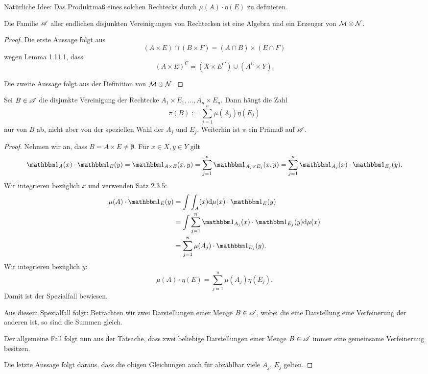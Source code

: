 \documentclass[
 a4paper,
 12pt,
 parskip=half
 ]{scrreprt}
\theoremstyle{plain}
\theoremstyle{definition}
\numberwithin{equation}{section}
\begin{document}
Natürliche Idee: Das Produktmaß eines solchen Rechtecks durch $\mu(A) \cdot \eta(E)$ zu definieren.

\begin{lem}
 Die Familie $\mathscr{A}$ aller endlichen disjunkten Vereinigungen von Rechtecken ist eine Algebra und ein Erzeuger von $\mathcal{M} \otimes \mathcal{N}$.
\end{lem}

\begin{proof}
 Die erste Aussage folgt aus
 \[ (A \times E) \cap (B \times F) = (A \cap B) \times (E \cap F) \]
 wegen Lemma 1.11.1, dass
 \[ (A \times E)^C = (X \times E^C) \cup (A^C \times Y). \]
 
 Die zweite Aussage folgt aus der Definition von $\mathcal{M} \otimes \mathcal{N}$.
\end{proof}

\begin{lem}
 Sei $B \in \mathscr{A}$ die disjunkte Vereinigung der Rechtecke $A_1 \times E_1, \ldots, A_n \times E_n$. Dann hängt die Zahl
 \[ \pi( B ) := \sum_{j=1}^n \mu(A_j) \eta(E_j) \]
 nur von $B$ ab, nicht aber von der speziellen Wahl der $A_j$ und $E_j$. Weiterhin ist $\pi$ ein Prämaß auf $\mathscr{A}$.
\end{lem}

\begin{proof}
 Nehmen wir an, dass $B = A \times E \ne \emptyset$. Für $x \in X, y \in Y$ gilt
 \[ \ind_A(x) \cdot \ind_E(y) = \ind_{A \times E}(x,y) = \sum_{j=1}^n \ind_{A_j \times E_j} (x,y) = \sum_{j=1}^n \ind_{A_j}(x) \cdot \ind_{E_j}(y). \]
 Wir integrieren bezüglich $x$ und verwenden Satz 2.3.5:
 \[ \begin{aligned}
     \mu(A) \cdot \ind_E (y) 
     &= \int \int_A(x) \diffop \mu(x) \cdot \ind_E(y) \\
     &= \int \sum_{j=1}^n \ind_{A_j} (x) \cdot \ind_{E_j}(y) \diffop \mu(x) \\
     &= \sum_{j=1}^n \mu(A_j) \cdot \ind_{E_j} (y).
    \end{aligned} \]
 Wir integrieren bezüglich $y$:
 \[ \mu(A) \cdot \eta(E) = \sum_{j=1}^n \mu(A_j) \eta(E_j). \]
 Damit ist der Spezialfall bewiesen.
 
 Aus diesem Spezialfall folgt: Betrachten wir zwei Darstellungen einer Menge $B \in \mathscr{A}$, wobei die eine Darstellung eine Verfeinerung der anderen ist, so sind die Summen gleich.
 
 Der allgemeine Fall folgt nun aus der Tatsache, dass zwei beliebige Darstellungen einer Menge $B \in \mathscr{A}$ immer eine gemeinsame Verfeinerung besitzen.
 
 Die letzte Aussage folgt daraus, dass die obigen Gleichungen auch für abzählbar viele $A_j$, $E_j$ gelten.
\end{proof}
\end{document}
